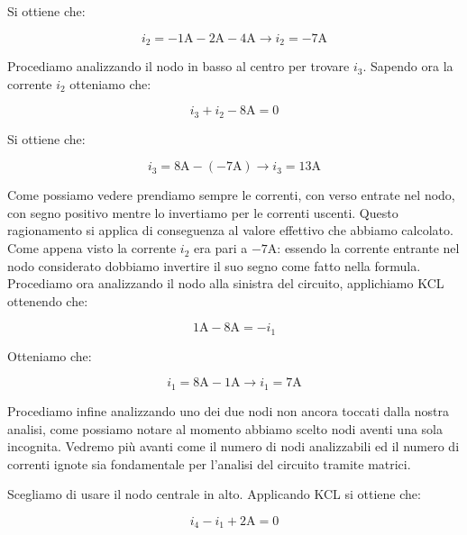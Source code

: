 \documentclass[../main.tex]{subfiles}
\begin{document}
Si ottiene che:

\begin{equation}
	i_2 = - \text{1A} - \text{2A} - \text{4A} \longrightarrow i_2 = - \text{7A}
\end{equation}

Procediamo analizzando il nodo in basso al centro per trovare $i_3$.
Sapendo ora la corrente $i_2$ otteniamo che:

\begin{equation}
	i_3 + i_2 - \text{8A} = 0
\end{equation}

Si ottiene che:

\begin{equation}
	i_3 = \text{8A} - (- \text{7A}) \longrightarrow i_3 = \text{13A}
\end{equation}

Come possiamo vedere prendiamo sempre le correnti, con verso entrate nel nodo,  con segno positivo mentre lo invertiamo per le correnti uscenti. Questo ragionamento si applica di conseguenza al valore effettivo che abbiamo calcolato. Come appena visto la corrente $i_2$ era pari a $- \text{7A}$: essendo la corrente entrante nel nodo considerato dobbiamo invertire il suo segno come fatto nella formula.\\

Procediamo ora analizzando il nodo alla sinistra del circuito, applichiamo KCL ottenendo che:

\begin{equation}
	\text{1A} - \text{8A} = -i_1
\end{equation}

Otteniamo che:

\begin{equation}
	i_1 = \text{8A} - \text{1A} \longrightarrow i_1 = \text{7A}  
\end{equation}


Procediamo infine analizzando uno dei due nodi non ancora toccati dalla nostra analisi, come possiamo notare al momento abbiamo scelto nodi aventi una sola incognita. Vedremo più avanti come il numero di nodi analizzabili ed il numero di correnti ignote sia fondamentale per l'analisi del circuito tramite matrici.

Scegliamo di usare il nodo centrale in alto. Applicando KCL si ottiene che:

\begin{equation}
	i_4 - i_1 + \text{2A} = 0
\end{equation}
\end{document}
